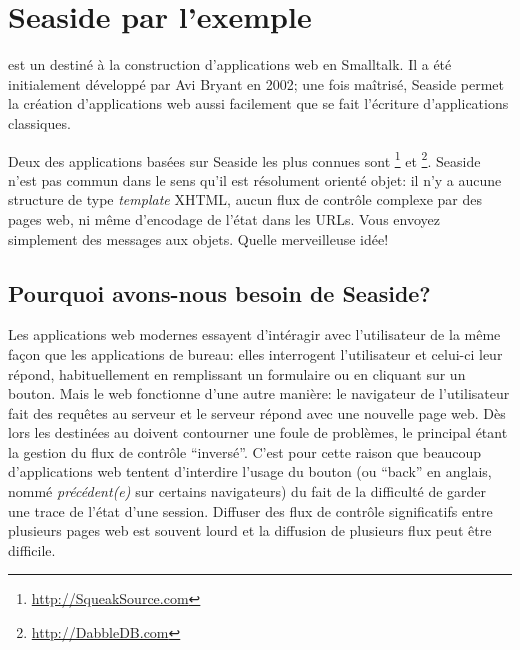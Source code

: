 \documentclass[a4paper,10pt,twoside]{book}
\begin{document}
	\sloppy
\fi
\chapter{Seaside par l'exemple}


 est un \framework destiné à la construction
d'applications web en Smalltalk. 
Il a été initialement développé par Avi Bryant  
en 2002; 
une fois maîtrisé, Seaside permet la création d'applications
web aussi facilement que se fait l'écriture d'applications classiques.

Deux des applications basées sur Seaside les plus connues sont 
 \footnote{\url{http://SqueakSource.com}} et \footnote{\url{http://DabbleDB.com}}.
Seaside n'est pas commun dans le sens qu'il est résolument orienté
objet: il n'y a aucune structure de type \emph{template} XHTML, aucun
flux de contrôle complexe par des pages web, ni même d'encodage de
l'état dans les URLs. Vous envoyez simplement des messages aux
objets. Quelle merveilleuse idée!

\section{Pourquoi avons-nous besoin de Seaside?}

Les applications web modernes essayent d'intéragir avec l'utilisateur
de la même façon que les applications de bureau: elles interrogent
l'utilisateur et celui-ci leur répond, habituellement en remplissant
un formulaire ou en cliquant sur un bouton.
Mais le web fonctionne d'une autre manière: le navigateur de
l'utilisateur fait des requêtes au serveur et le serveur répond avec
une nouvelle page web.
Dès lors les \frameworks destinées au
 doivent contourner une foule de
problèmes, le principal étant la gestion du flux de contrôle ``inversé''.
C'est pour cette raison que beaucoup d'applications web tentent
d'interdire l'usage du bouton \backbtn (ou ``back'' en anglais, nommé
\emph{précédent(e)} sur certains navigateurs) du fait de la
difficulté de garder une trace de l'état d'une session.
Diffuser des flux de contrôle significatifs entre plusieurs pages web 
est souvent lourd et la diffusion de plusieurs flux peut être difficile.
\end{document}
